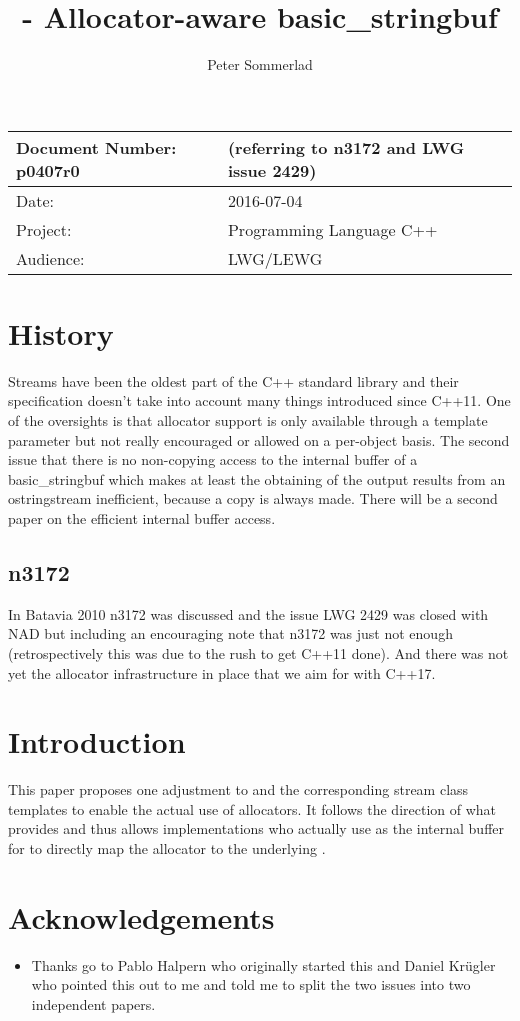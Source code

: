 \documentclass[ebook,11pt,article]{memoir}
\title{\papernumber{} - Allocator-aware basic\_stringbuf}
\author{Peter Sommerlad}
\date{\paperdate}                        %
\newcommand{\papernumber}{p0407r0}
\newcommand{\paperdate}{2016-07-04}
\begin{document}
\maketitle
\begin{tabular}[t]{|l|l|}\hline 
Document Number: \papernumber &   (referring to n3172 and LWG issue 2429)\\\hline
Date: & \paperdate \\\hline
Project: & Programming Language C++\\\hline 
Audience: & LWG/LEWG\\\hline
\end{tabular}

\chapter{History}
Streams have been the oldest part of the C++ standard library and their specification doesn't take into account many things introduced since C++11. One of  the oversights is that allocator support is only available through a template parameter but not really encouraged or allowed on a per-object basis. The second issue that there is no non-copying access to the internal buffer of a basic_stringbuf which makes at least the obtaining of the output results from an ostringstream inefficient, because a copy is always made. There will be a second paper on the efficient internal buffer access.
\section{n3172}
In Batavia 2010 n3172 was discussed and the issue LWG 2429 was closed with NAD but including an encouraging note that n3172 was just not enough (retrospectively this was due to the rush to get C++11 done). And there was not yet the allocator infrastructure in place that we aim for with C++17.


\chapter{Introduction}
This paper proposes one adjustment to  and the corresponding stream class templates to enable the actual use of allocators. It follows the direction of what  provides and thus allows implementations who actually use  as the internal buffer for  to directly map the allocator to the underlying .

\chapter{Acknowledgements}
\begin{itemize}
\item Thanks go to Pablo Halpern who originally started this and Daniel Kr\"ugler who pointed this out to me and told me to split the two issues into two independent papers.
\end{itemize}
\end{document}
